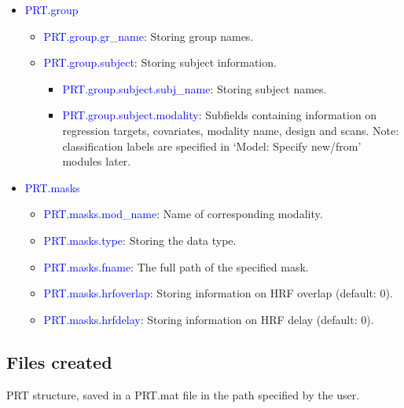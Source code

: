 \begin{itemize}
\item \textcolor{blue}{PRT.group}

\begin{itemize}
\item \textcolor{blue}{PRT.group.gr\_name}: Storing group names.
\item \textcolor{blue}{PRT.group.subject}: Storing subject information.

\begin{itemize}
\item \textcolor{blue}{PRT.group.subject.subj\_name}: Storing subject names.
\item \textcolor{blue}{PRT.group.subject.modality}: Subfields containing information on regression targets, covariates, modality name, design and scans. Note: classification labels are specified in `Model: Specify new/from' modules later.


\end{itemize}
\end{itemize}

\item \textcolor{blue}{PRT.masks}

\begin{itemize}
\item \textcolor{blue}{PRT.masks.mod\_name}: Name of corresponding modality.
\item \textcolor{blue}{PRT.masks.type}: Storing the data type.
\item \textcolor{blue}{PRT.masks.fname}: The full path of the specified mask.
\item \textcolor{blue}{PRT.masks.hrfoverlap}: Storing information on HRF overlap (default: 0).
\item \textcolor{blue}{PRT.masks.hrfdelay}: Storing information on HRF delay (default: 0).

\end{itemize}
\end{itemize}



\subsection{Files created}

PRT structure, saved in a PRT.mat file in the path specified by the user.



